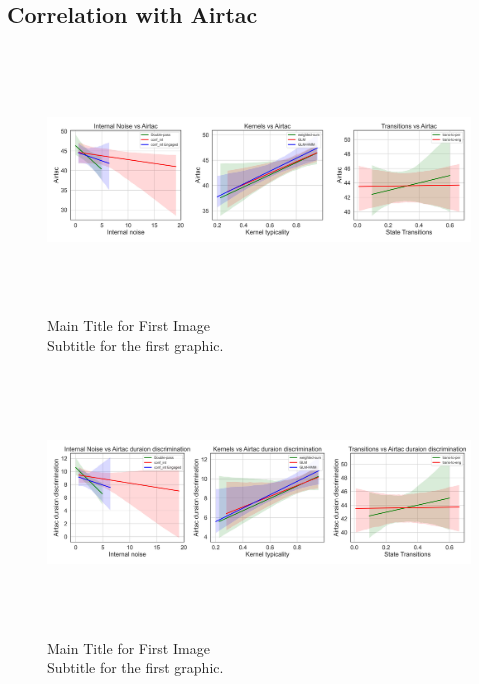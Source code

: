 \subsection {Correlation with Airtac} 
\begin{figure}[H]
    \centering
    \includegraphics[width=17cm,height=7cm]{MainLayout/Images/chapter8/regression_results_airtac.jpg}
    \caption{Main Title for First Image \\ \small Subtitle for the first graphic.}
    \label{fig:regression_results_airtac}
\end{figure}

\begin{figure}[H]
    \centering
    \includegraphics[width=17cm,height=7cm]{MainLayout/Images/chapter8/regression_results_airtac_dur_discr.jpg}
    \caption{Main Title for First Image \\ \small Subtitle for the first graphic.}
    \label{fig:regression_results_airtac_dur_discr}
\end{figure}

